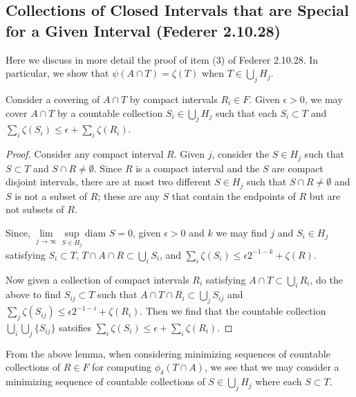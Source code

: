 \subsection{Collections of Closed Intervals that are Special for a Given Interval (Federer 2.10.28)}

Here we discuss in more detail the proof of item (3) of Federer 2.10.28. In particular, we show that 
\(\psi(A \cap T) = \zeta(T)\) when \(T \in \bigcup_j H_j\).

\begin{lemma}
Consider a covering of \(A \cap T\) by compact intervals \(R_i \in F\). Given \(\epsilon > 0\), we may
cover \(A \cap T\) by a countable collection \(S_i \in \bigcup_j H_j\) such that each \(S_i \subset T\) and
\(\sum_i \zeta(S_i) \leq \epsilon + \sum_i \zeta(R_i)\).
\end{lemma}
\begin{proof}
Consider any compact interval \(R\). Given \(j\), consider the
\(S \in H_j\) such that \(S \subset T\) and \(S \cap R \neq \emptyset\). Since \(R\) is a compact interval
and the \(S\) are compact disjoint intervals, there are at most
two different \(S \in H_j\) such that \(S \cap R \neq \emptyset\) and \(S\) is not a subset of \(R\); these
are any \(S\) that contain the endpoints of \(R\) but are not subsets of \(R\). 

Since, \(\lim\limits_{j\to \infty}\sup\limits_{S\in H_j} \text{diam } S = 0\), given \(\epsilon > 0\) and
\(k\) we may find \(j\) and \(S_i \in H_j\) satisfying \(S_i \subset T\),
\(T \cap A \cap R \subset \bigcup_i S_i\), and 
\(\sum_i \zeta(S_i) \leq \epsilon 2^{-1-k} + \zeta(R)\).

Now given a collection of compact intervals \(R_i\) satisfying \(A \cap T \subset \bigcup_i R_i\), do the above
to find \(S_{ij} \subset T\) such that \(A \cap T \cap R_i \subset \bigcup_j S_{ij}\) and
\(\sum_j \zeta(S_{ij}) \leq \epsilon 2^{-1 - i} + \zeta(R_i)\). Then we find that the countable collection
\(\bigcup_i \bigcup_j \{S_{ij}\}\) satsifies
\(\sum_i \zeta(S_i) \leq \epsilon + \sum_i \zeta(R_i)\). 
\end{proof}

From the above lemma, when considering minimizing sequences of countable collections of \(R\in F\) for
computing \(\phi_\delta(T \cap A)\),
we see that we may consider a minimizing sequence of countable collections of \(S \in \bigcup_j H_j\) where
each \(S \subset T\).

